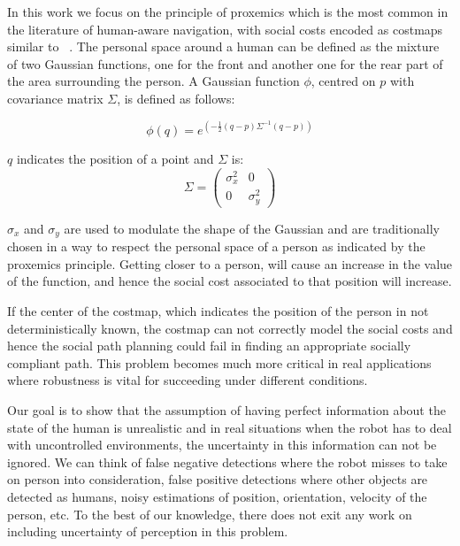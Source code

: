 In this work we focus on the principle of proxemics which is the most common in the literature of human-aware navigation, with social costs encoded as costmaps similar to ~\cite{gomez2013social}. The personal space around a human can be defined as the mixture of two Gaussian functions, one for the front and another one for the rear part of the area surrounding the person.
A Gaussian function $\phi$, centred on $p$ with covariance matrix $\Sigma$, is defined as follows:

\begin{equation}
\phi(q) = e^{(-\frac{1}{2}(q-p)\Sigma^{-1}(q-p))}
\end{equation}

$q$ indicates the position of a point and $\Sigma$ is:
\begin{equation}
\Sigma = \begin{pmatrix}
{\sigma}_{x}^2  & 0\\ 
 0& {\sigma}_{y}^2 
\end{pmatrix}
\end{equation}

${\sigma}_{x}$ and ${\sigma}_{y}$ are used to modulate the shape of the Gaussian and are traditionally chosen in a way to respect the personal space of a person as indicated by the proxemics principle. Getting closer to a person, will cause an increase in the value of the function, and hence the social cost associated to that position will increase.


If the center of the costmap, which indicates the position of the person in not deterministically known, the costmap can not correctly model the social costs and hence the social path planning could fail in finding an appropriate socially compliant path. This problem becomes much more critical in real applications where robustness is vital for succeeding under different conditions.

Our goal is to show that the assumption of having perfect information about the state of the human is unrealistic and in real situations when the robot has to deal with uncontrolled environments, the uncertainty in this information can not be ignored. We can think of false negative detections where the robot misses to take on person into consideration, false positive detections where other objects are detected as humans, noisy estimations of position, orientation, velocity of the person, etc. To the best of our knowledge, there does not exit any work on including uncertainty of perception in this problem.


